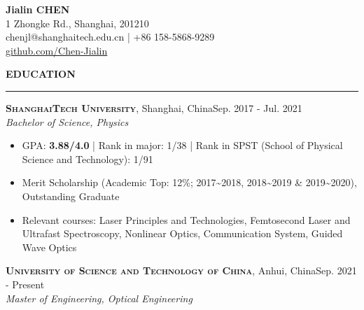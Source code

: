 \documentclass[letterpaper,11pt]{article}
\begin{document}
\begin{center}
    {\LARGE\bfseries{}Jialin CHEN}\\
    \vspace{1ex}
    1 Zhongke Rd., Shanghai, 201210\\
    chenjl@shanghaitech.edu.cn | +86 158-5868-9289\\
    \href{https://github.com/Chen-Jialin}{github.com/Chen-Jialin}\\
\end{center}
\vspace{-1ex}

{\Large\bfseries{}EDUCATION}\\
\vspace{-1ex}
\rule[1.5ex]{\columnwidth}{1pt}
{\large\bfseries\scshape{}ShanghaiTech University}, {Shanghai, China}\hfill{Sep. 2017 - Jul. 2021}\\
{\itshape{}Bachelor of Science, Physics}\\
\vspace{-4ex}
\begin{itemize}
    \item GPA: \textbf{3.88/4.0} | Rank in major: 1/38 | Rank in SPST (School of Physical Science and Technology): 1/91
    \item Merit Scholarship (Academic Top: 12\%; 2017\textasciitilde2018, 2018\textasciitilde2019 \& 2019\textasciitilde2020), Outstanding Graduate
    \item Relevant courses: Laser Principles and Technologies, Femtosecond Laser and Ultrafast Spectroscopy, Nonlinear Optics, Communication System, Guided Wave Optics
\end{itemize}
{\large\bfseries\scshape{}University of Science and Technology of China}, {Anhui, China}\hfill{Sep. 2021 - Present}\\
{\itshape{}Master of Engineering, Optical Engineering}\\
\end{document}
